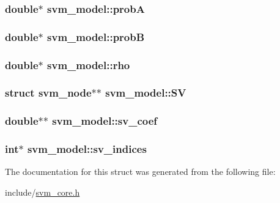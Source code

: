 \subsubsection[{probA}]{\setlength{\rightskip}{0pt plus 5cm}double$\ast$ svm\+\_\+model\+::probA}\hypertarget{structsvm__model_adf5f28fcdd3ca1c5b23c1f6167710a04}{}\label{structsvm__model_adf5f28fcdd3ca1c5b23c1f6167710a04}
\subsubsection[{probB}]{\setlength{\rightskip}{0pt plus 5cm}double$\ast$ svm\+\_\+model\+::probB}\hypertarget{structsvm__model_a73ba8feaaf3c2c38c6bb81f7bcb5809e}{}\label{structsvm__model_a73ba8feaaf3c2c38c6bb81f7bcb5809e}
\subsubsection[{rho}]{\setlength{\rightskip}{0pt plus 5cm}double$\ast$ svm\+\_\+model\+::rho}\hypertarget{structsvm__model_a16e4dea1508f93ece4384ec35c991887}{}\label{structsvm__model_a16e4dea1508f93ece4384ec35c991887}
\subsubsection[{SV}]{\setlength{\rightskip}{0pt plus 5cm}struct {\bf svm\+\_\+node}$\ast$$\ast$ svm\+\_\+model\+::\+SV}\hypertarget{structsvm__model_a96da6fe173a7150dae95bf55d5539e45}{}\label{structsvm__model_a96da6fe173a7150dae95bf55d5539e45}
\subsubsection[{sv\+\_\+coef}]{\setlength{\rightskip}{0pt plus 5cm}double$\ast$$\ast$ svm\+\_\+model\+::sv\+\_\+coef}\hypertarget{structsvm__model_a978084d722ac886100ffcc35fc931143}{}\label{structsvm__model_a978084d722ac886100ffcc35fc931143}
\subsubsection[{sv\+\_\+indices}]{\setlength{\rightskip}{0pt plus 5cm}int$\ast$ svm\+\_\+model\+::sv\+\_\+indices}\hypertarget{structsvm__model_add7f649bf78428c38a282ed8776fa433}{}\label{structsvm__model_add7f649bf78428c38a282ed8776fa433}


The documentation for this struct was generated from the following file\+:\begin{DoxyCompactItemize}
\item 
include/\hyperlink{svm__core_8h}{svm\+\_\+core.\+h}\end{DoxyCompactItemize}
